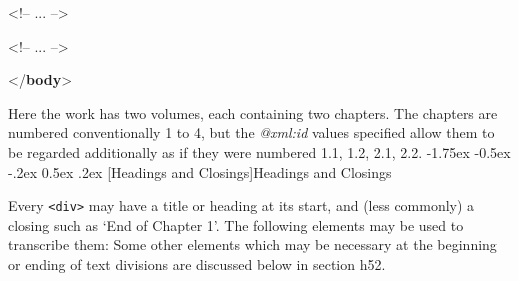\documentclass[11pt,twoside]{article}\makeatletter
\makeatletter
\renewcommand\section{\@startsection {section}{1}{\z@}%
     {-1.75ex \@plus -0.5ex \@minus -.2ex}%
     {0.5ex \@plus .2ex}%
     {\reset@font\Large\bfseries\sffamily}}
\renewcommand\subsection{\@startsection{subsection}{2}{\z@}%
     {-1.75ex\@plus -0.5ex \@minus- .2ex}%
     {0.5ex \@plus .2ex}%
     {\reset@font\Large\sffamily}}
\def\DivII{\subsection}
\def\DivII{\section}
\makeatother
\begin{document}
\begin{shaded}
\hspace*{6pt}\mbox{}\newline 
\begin{it}<!-- ... -->\end{it}\mbox{}\newline 
\hspace*{6pt}\mbox{}\newline 
\hspace*{6pt}\mbox{}\newline 
\begin{it}<!-- ... -->\end{it}\mbox{}\newline 
\hspace*{6pt}\mbox{}\newline 
{}\mbox{}\newline 
{</\textbf{body}>}\end{shaded}\egroup\par \noindent  Here the work has two volumes, each containing two chapters. The chapters are numbered conventionally 1 to 4, but the \textit{@xml:id} values specified allow them to be regarded additionally as if they were numbered 1.1, 1.2, 2.1, 2.2.
\DivII[Headings and Closings]{Headings and Closings}\label{h25}\par
Every \texttt{<div>}  may have a title or heading at its start, and (less commonly) a closing such as ‘End of Chapter 1’.  The following elements may be used to transcribe them:    Some other elements which may be necessary at the beginning or ending of text divisions are discussed below in section h52.\par
\end{document}
